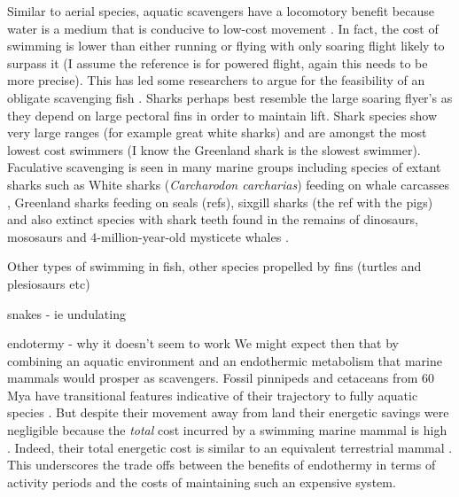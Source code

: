 \documentclass[a4paper,12pt]{article}
\begin{document}
Similar to aerial species, aquatic scavengers have a locomotory benefit because water is a medium that is conducive to low-cost movement \citep{tucker1975energetic}. In fact, the cost of swimming is lower than either running or flying \citep{williams1999evolution} with only soaring flight likely to surpass it (I assume the reference is for powered flight, again this needs to be more precise). This has led some researchers to argue for the feasibility of an obligate scavenging fish \citep{ruxton2004energetic,ruxton2005searching}. Sharks perhaps best resemble the large soaring flyer's as they depend on large pectoral fins in order to maintain lift. Shark species show very large ranges (for example great white sharks) and are amongst the most lowest cost swimmers (I know the Greenland shark is the slowest swimmer). Faculative scavenging is seen in many marine groups including species of extant sharks such as White sharks (\textit{Carcharodon carcharias}) feeding on whale carcasses \citep{fallows2013white}, Greenland sharks feeding on seals (refs), sixgill sharks (the ref with the pigs) and also extinct species with shark teeth found in the remains of dinosaurs, mososaurs and 4-million-year-old mysticete whales \citep{schwimmer1997scavenging,ehret2009caught}. 

Other types of swimming in fish, other species propelled by fins (turtles and plesiosaurs etc)

snakes - ie undulating

endotermy - why it doesn't seem to work
We might expect then that by combining an aquatic environment and an endothermic metabolism that marine mammals would prosper as scavengers.
Fossil pinnipeds and cetaceans from 60 Mya have transitional features indicative of their trajectory to fully aquatic species \citep{williams1999evolution}.  
But despite their movement away from land their energetic savings were negligible because the \textit{total} cost incurred by a swimming marine mammal is high \citep{williams1999evolution}. 
Indeed, their total energetic cost is similar to an equivalent terrestrial mammal \citep{williams1999evolution}.
This underscores the trade offs between the benefits of endothermy in terms of activity periods and the costs of maintaining such an expensive system. 

\end{document}
